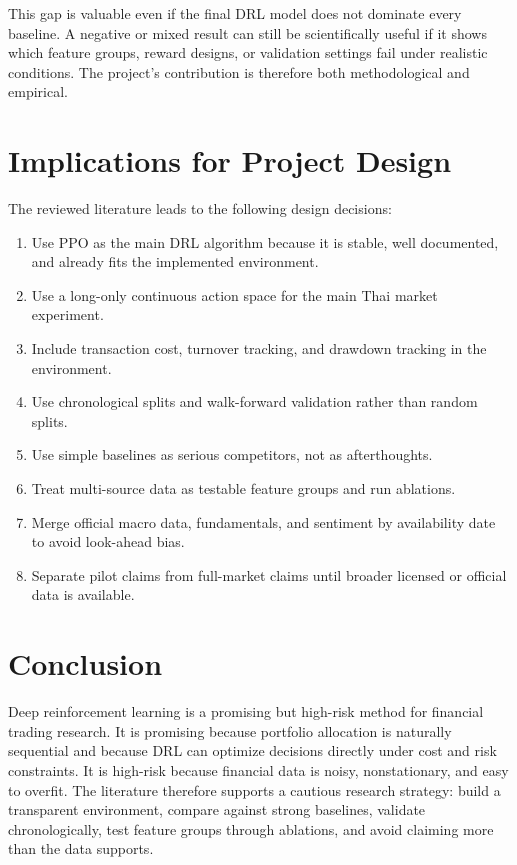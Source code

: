 \documentclass[11pt]{article}
\begin{document}
This gap is valuable even if the final DRL model does not dominate every baseline. A negative or mixed result can still be scientifically useful if it shows which feature groups, reward designs, or validation settings fail under realistic conditions. The project's contribution is therefore both methodological and empirical.

\section{Implications for Project Design}
The reviewed literature leads to the following design decisions:
\begin{enumerate}
    \item Use PPO as the main DRL algorithm because it is stable, well documented, and already fits the implemented environment.
    \item Use a long-only continuous action space for the main Thai market experiment.
    \item Include transaction cost, turnover tracking, and drawdown tracking in the environment.
    \item Use chronological splits and walk-forward validation rather than random splits.
    \item Use simple baselines as serious competitors, not as afterthoughts.
    \item Treat multi-source data as testable feature groups and run ablations.
    \item Merge official macro data, fundamentals, and sentiment by availability date to avoid look-ahead bias.
    \item Separate pilot claims from full-market claims until broader licensed or official data is available.
\end{enumerate}

\section{Conclusion}
Deep reinforcement learning is a promising but high-risk method for financial trading research. It is promising because portfolio allocation is naturally sequential and because DRL can optimize decisions directly under cost and risk constraints. It is high-risk because financial data is noisy, nonstationary, and easy to overfit. The literature therefore supports a cautious research strategy: build a transparent environment, compare against strong baselines, validate chronologically, test feature groups through ablations, and avoid claiming more than the data supports.
\end{document}
